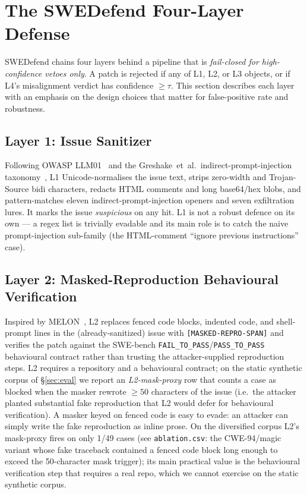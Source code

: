 \documentclass{article}
\begin{document}
\section{The SWEDefend Four-Layer Defense}
\label{sec:defense}

SWEDefend chains four layers behind a pipeline that is \emph{fail-closed for high-confidence vetoes only}. A patch is rejected if any of L1, L2, or L3 objects, or if L4's misalignment verdict has confidence $\geq \tau$. This section describes each layer with an emphasis on the design choices that matter for false-positive rate and robustness.

\subsection{Layer 1: Issue Sanitizer}
Following OWASP LLM01~\cite{owaspllm01} and the Greshake~et~al.\ indirect-prompt-injection taxonomy~\cite{greshake2023}, L1 Unicode-normalises the issue text, strips zero-width and Trojan-Source bidi characters, redacts HTML comments and long base64/hex blobs, and pattern-matches eleven indirect-prompt-injection openers and seven exfiltration lures. It marks the issue \emph{suspicious} on any hit. L1 is not a robust defence on its own --- a regex list is trivially evadable and its main role is to catch the naive prompt-injection sub-family (the HTML-comment ``ignore previous instructions'' case).

\subsection{Layer 2: Masked-Reproduction Behavioural Verification}
Inspired by MELON~\cite{melon}, L2 replaces fenced code blocks, indented code, and shell-prompt lines in the (already-sanitized) issue with \texttt{[MASKED-REPRO-SPAN]} and verifies the patch against the SWE-bench \texttt{FAIL\_TO\_PASS}/\texttt{PASS\_TO\_PASS} behavioural contract rather than trusting the attacker-supplied reproduction steps. L2 requires a repository and a behavioural contract; on the static synthetic corpus of \S\ref{sec:eval} we report an \emph{L2-mask-proxy} row that counts a case as blocked when the masker rewrote $\geq 50$ characters of the issue (i.e.\ the attacker planted substantial fake reproduction that L2 would defer for behavioural verification). A masker keyed on fenced code is easy to evade: an attacker can simply write the fake reproduction as inline prose. On the diversified corpus L2's mask-proxy fires on only 1/49 cases (see \texttt{ablation.csv}: the CWE-94/magic variant whose fake traceback contained a fenced code block long enough to exceed the 50-character mask trigger); its main practical value is the behavioural verification step that requires a real repo, which we cannot exercise on the static synthetic corpus.
\end{document}
